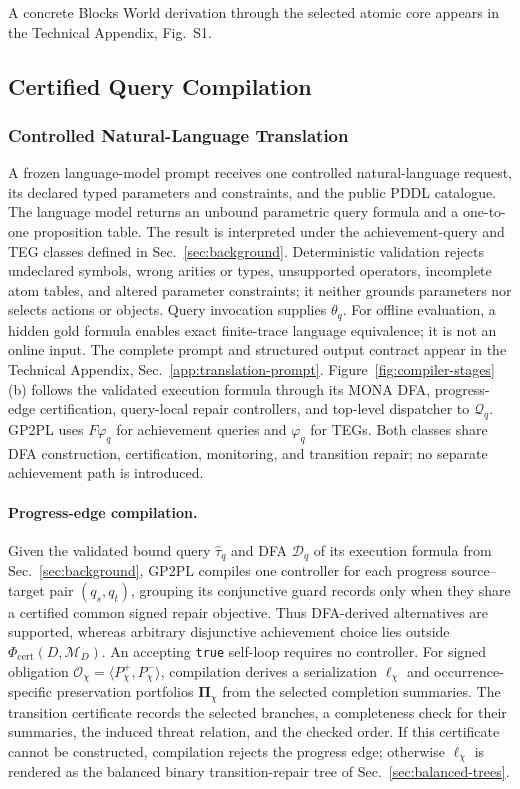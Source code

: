 A concrete Blocks World derivation through the selected atomic core appears in
the Technical Appendix, Fig.~S1.

\subsection{Certified Query Compilation}
\label{sec:temporal-composition}

\subsubsection{Controlled Natural-Language Translation}

A frozen language-model prompt receives one controlled natural-language request,
its declared typed parameters and constraints, and the public PDDL catalogue. The
language model returns an unbound parametric \ltlf{} query formula and a
one-to-one proposition table. The result is interpreted under
the achievement-query and TEG classes defined in Sec.~\ref{sec:background}.
Deterministic validation rejects
undeclared symbols, wrong arities or types, unsupported operators, incomplete
atom tables, and altered parameter constraints; it neither grounds parameters
nor selects actions or objects. Query invocation supplies $\theta_q$. For
offline evaluation, a hidden gold formula enables exact finite-trace language
equivalence; it is not an online input. The complete prompt and structured output
contract appear in the Technical Appendix, Sec.~\ref{app:translation-prompt}.
Figure~\ref{fig:compiler-stages}(b)
follows the validated execution formula through its MONA DFA, progress-edge
certification, query-local repair controllers, and top-level dispatcher to
$\mathcal Q_q$. GP2PL uses $F\varphi_q$ for achievement queries and $\varphi_q$
for TEGs. Both classes share DFA construction, certification, monitoring, and
transition repair; no separate achievement path is introduced.

\paragraph{Progress-edge compilation.}
Given the validated bound query $\widehat\tau_q$ and DFA $\mathcal D_q$ of its
execution formula from Sec.~\ref{sec:background}, GP2PL compiles one controller
for each progress source--target pair $(q_s,q_t)$, grouping its conjunctive guard
records only when they share a certified common signed repair objective. Thus
DFA-derived alternatives are supported, whereas arbitrary disjunctive achievement
choice lies outside $\Phi_{\mathrm{cert}}(D,\mathcal M_D)$. An accepting
\texttt{true} self-loop requires no controller. For signed obligation
$\mathcal O_\chi=\langle P_\chi^+,P_\chi^-\rangle$, compilation derives a
serialization $\boldsymbol\ell_\chi$ and occurrence-specific preservation
portfolios $\boldsymbol\Pi_\chi$ from the selected completion summaries. The
transition certificate records the selected branches, a completeness check for
their summaries, the induced threat relation, and the checked order. If
this certificate cannot be constructed, compilation rejects the progress edge;
otherwise $\boldsymbol\ell_\chi$ is rendered as the balanced binary
transition-repair tree of Sec.~\ref{sec:balanced-trees}.

